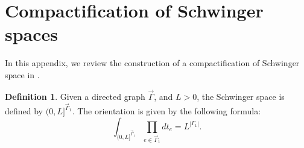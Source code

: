 \documentclass[11pt]{amsart}
\theoremstyle{definition}
\newtheorem{defn}[thm]{Definition}
\theoremstyle{remark}
\newtheorem{rem}[thm]{Remark}
\numberwithin{equation}{section}
\begin{document}
%
%

\section{Compactification of Schwinger spaces}\label{Schwinger spaces}

In this appendix, we review the construction of a compactification of
Schwinger space in {\cite{wang2024feynman,Wang:2024tjf}}.

\begin{defn}
  Given a directed graph $\vec{\Gamma}$, and $L > 0$, the {{Schwinger
  space}} is defined by $(0, L]^{\vec{\Gamma}_1 }$. The orientation is given by
  the following formula:
  \[ \int_{(0, L]^{\vec{\Gamma}_1}} \prod_{e \in \vec{\Gamma}_1} d t_e = L^{| \Gamma_1
     |} . \]
\end{defn}
\end{document}
